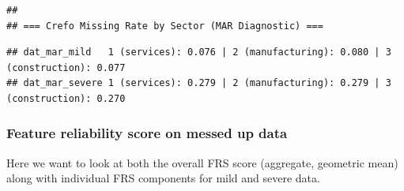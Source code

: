 \documentclass[
]{article}
\newenvironment{Shaded}{\begin{snugshade}}{\end{snugshade}}
\newcommand{\ControlFlowTok}[1]{\textcolor[rgb]{0.13,0.29,0.53}{\textbf{#1}}}
\newcommand{\FunctionTok}[1]{\textcolor[rgb]{0.13,0.29,0.53}{\textbf{#1}}}
\newcommand{\NormalTok}[1]{#1}
\newcommand{\OtherTok}[1]{\textcolor[rgb]{0.56,0.35,0.01}{#1}}
\newcommand{\SpecialCharTok}[1]{\textcolor[rgb]{0.81,0.36,0.00}{\textbf{#1}}}
\newcommand{\StringTok}[1]{\textcolor[rgb]{0.31,0.60,0.02}{#1}}
\begin{document}
\begin{verbatim}
## 
## === Crefo Missing Rate by Sector (MAR Diagnostic) ===
\end{verbatim}

\begin{Shaded}
\end{Shaded}

\begin{verbatim}
## dat_mar_mild   1 (services): 0.076 | 2 (manufacturing): 0.080 | 3 (construction): 0.077
## dat_mar_severe 1 (services): 0.279 | 2 (manufacturing): 0.279 | 3 (construction): 0.270
\end{verbatim}

\subsubsection{Feature reliability score on messed up
data}\label{feature-reliability-score-on-messed-up-data}

Here we want to look at both the overall FRS score (aggregate, geometric
mean) along with individual FRS components for mild and severe data.
\end{document}
